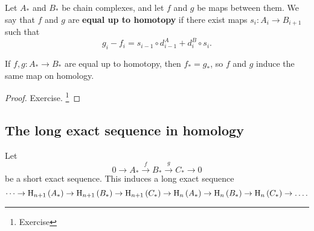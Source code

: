 Let $ A_* $ and $ B_* $ be chain complexes, and let $ f $ and $ g $ be maps between them. We say that $ f $ and $ g $ are \textbf{equal up to homotopy} if there exist maps $ s_i : A_i \to B_{i + 1} $ such that
$$ g_i - f_i = s_{i - 1} \circ d_{i - 1}^A + d_i^B \circ s_i. $$

\begin{proposition}
If $ f, g : A_* \to B_* $ are equal up to homotopy, then $ f_* = g_* $, so $ f $ and $ g $ induce the same map on homology.
\end{proposition}

\begin{proof}
Exercise. \footnote{Exercise}
\end{proof}

\subsection{The long exact sequence in homology}

\begin{proposition}
Let
$$ 0 \to A_* \xrightarrow{f} B_* \xrightarrow{g} C_* \to 0 $$
be a short exact sequence. This induces a long exact sequence
$$ \dots \to \H_{n + 1}\br{A_*} \to \H_{n + 1}\br{B_*} \to \H_{n + 1}\br{C_*} \to \H_n\br{A_*} \to \H_n\br{B_*} \to \H_n\br{C_*} \to \dots. $$
\end{proposition}

